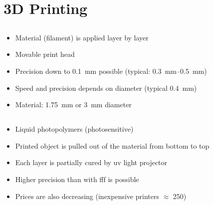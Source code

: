 \documentclass[aspectratio=169]{beamer}
\begin{document}
\section{3D Printing}
\subsection{}
\begin{frame}
    \begin{itemize}
        \item Material (filament) is applied layer by layer
        \item Movable print head
        \item Precision down to \SI{0.1}{\milli\meter} possible (typical: \SIrange{0.3}{0.5}{\milli\meter})
        \item Speed and precision depends on diameter (typical \SI{0.4}{\milli\meter})
        \item Material: \SI{1.75}{\milli\meter} or \SI{3}{\milli\meter} diameter
    \end{itemize}
\end{frame}

\begin{frame}

\end{frame}

\subsection{}
\begin{frame}
    \begin{itemize}
        \item Liquid photopolymers (photosensitive)
        \item Printed object is pulled out of the material from bottom to top
        \item Each layer is partially cured by \acs{uv} light projector
        \item Higher precision than with \acs{fff} is possible
        \item Prices are also decreasing (inexpensive printers $\approx$ \SI{250}{\sieuro})
    \end{itemize}
\end{frame}

\begin{frame}

\end{frame}

\subsection{}
\end{document}
